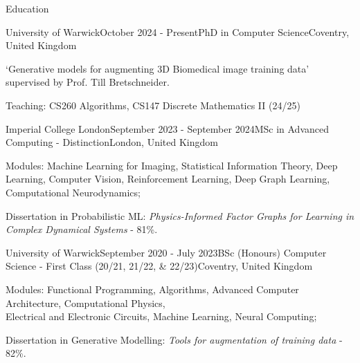 \documentclass{resume}
\begin{document}
    \begin{rSection}{Education}
        \begin{rSubsection}{University of Warwick}{October 2024 - Present}{PhD in Computer Science}{Coventry, United Kingdom}{}
            \item `Generative models for augmenting 3D Biomedical image training data' supervised by Prof. Till Bretschneider.
            \item Teaching: CS260 Algorithms, CS147 Discrete Mathematics II (24/25)
        \end{rSubsection}
        \begin{rSubsection}{Imperial College London}{September 2023 - September 2024}{MSc in Advanced Computing - Distinction}{London, United Kingdom}{}
            \item Modules: Machine Learning for Imaging, Statistical Information Theory, Deep Learning, Computer Vision, Reinforcement Learning, Deep Graph Learning, Computational Neurodynamics; 
            \item Dissertation in Probabilistic ML: \emph{Physics-Informed Factor Graphs for Learning in Complex Dynamical Systems} - 81\%.
        \end{rSubsection}
        \begin{rSubsection}{University of Warwick}{September 2020 - July 2023}{BSc (Honours) Computer Science - First Class (20/21, 21/22, \& 22/23)}{Coventry, United Kingdom}{}
            \item Modules: Functional Programming, Algorithms, Advanced Computer Architecture, Computational Physics, \\Electrical and Electronic Circuits, Machine Learning, Neural Computing;
            \item Dissertation in Generative Modelling: \emph{Tools for augmentation of training data} - 82\%.
        \end{rSubsection}
    \end{rSection} 
\end{document}
